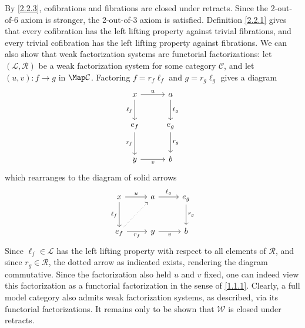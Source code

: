 \begin{remark}\label{2.3.3}
	By \cref{2.2.3}, cofibrations and fibrations are closed under retracts. Since the 2-out-of-6 axiom is stronger, the 2-out-of-3 axiom is satisfied. Definition \ref{2.2.1} gives that every cofibration has the left lifting property against trivial fibrations, and every trivial cofibration has the left lifting property against fibrations. We can also show that weak factorization systems are functorial factorizations: let $(\mathcal{L} ,\mathcal{R} )$ be a weak factorization system for some category $\mathcal{C} $, and let $(u,v): f \to g$ in $\Map \mathcal{C} $. Factoring $f=r_f\ell _f$ and $g=r_g\ell _g$ gives a diagram
	\[\begin{tikzcd}[row sep = 2.5em, column sep = 2.5em]
	x \ar[" \ell _f "', d] \ar[" u ", r]  & a \ar[" \ell _g ", d]  \\
	e_f \ar[" r_f "', d]  & e_g \ar[" r_g ", d]  \\
	y \ar[" v "', r]  & b
	\end{tikzcd}\]
	which rearranges to the diagram of solid arrows
	\[\begin{tikzcd}[row sep = 2.5em, column sep = 2.5em]
	x \ar[" u ", r] \ar[" \ell _f "', d]  & a \ar[" \ell _g ", r]  & e_g \ar[" r_g ", d]  \\
	e_f \ar[" r_f "', r] \ar[dotted, ur]  & y \ar[" v "', r]  & b
	\end{tikzcd}\]
	Since $\ell _f\in \mathcal{L} $ has the left lifting property with respect to all elements of $\mathcal{R} $, and since $r_g\in \mathcal{R} $, the dotted arrow as indicated exists, rendering the diagram commutative. Since the factorization also held $u$ and $v$ fixed, one can indeed view this factorization as a functorial factorization in the sense of \cref{1.1.1}. Clearly, a full model category also admits weak factorization systems, as described, via its functorial factorizations. It remains only to be shown that $\mathcal{W} $ is closed under retracts.
\end{remark}


